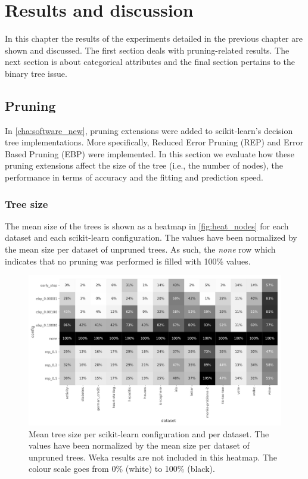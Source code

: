 \chapter{Results and discussion}\label{cha:results}
In this chapter the results of the experiments detailed in the previous chapter are shown and discussed. The first section deals with pruning-related results. The next section is about categorical attributes and the final section pertains to the binary tree issue.

\section{Pruning}
In \autoref{cha:software_new}, pruning extensions were added to scikit-learn's decision tree implementations. More specifically, Reduced Error Pruning (REP) and Error Based Pruning (EBP) were implemented. In this section we evaluate how these pruning extensions affect the size of the tree (i.e., the number of nodes), the performance in terms of accuracy and the fitting and prediction speed.

\subsection{Tree size}
The mean size of the trees is shown as a heatmap in \autoref{fig:heat_nodes} for each dataset and each scikit-learn configuration. The values have been normalized by the mean size per dataset of unpruned trees. As such, the \emph{none} row which indicates that no pruning was performed is filled with 100\% values.

\begin{figure}[htp]
    \includegraphics[width=\textwidth]{img/heatmap_n_nodes.pdf}
    \caption{Mean tree size per scikit-learn configuration and per dataset. The values have been normalized by the mean size per dataset of unpruned trees. Weka results are not included in this heatmap. The colour scale goes from 0\% (white) to 100\% (black).}%
    \label{fig:heat_nodes}
\end{figure}

